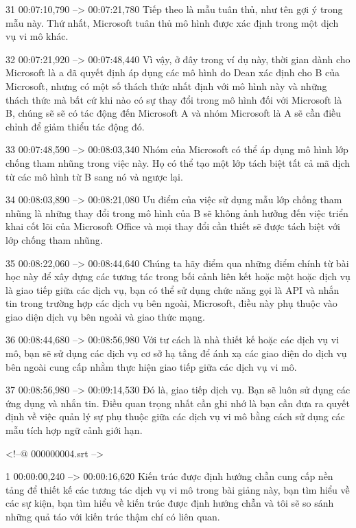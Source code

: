 31
00:07:10,790 --> 00:07:21,780
Tiếp theo là mẫu tuân thủ, như tên gợi ý trong mẫu này.  Thứ nhất, Microsoft tuân thủ mô hình được xác định trong một dịch vụ vi mô khác.

32
00:07:21,920 --> 00:07:48,440
Vì vậy, ở đây trong ví dụ này, thời gian dành cho Microsoft là a đã quyết định áp dụng các mô hình do Dean xác định cho B của Microsoft, nhưng có một số thách thức nhất định với mô hình này và những thách thức mà bất cứ khi nào có sự thay đổi trong mô hình đối với Microsoft là B, chúng sẽ  sẽ có tác động đến Microsoft A và nhóm Microsoft là A sẽ cần điều chỉnh để giảm thiểu tác động đó.

33
00:07:48,590 --> 00:08:03,340
Nhóm của Microsoft có thể áp dụng mô hình lớp chống tham nhũng trong việc này.  Họ có thể tạo một lớp tách biệt tất cả mã dịch từ các mô hình từ B sang nó và ngược lại.

34
00:08:03,890 --> 00:08:21,080
Ưu điểm của việc sử dụng mẫu lớp chống tham nhũng là những thay đổi trong mô hình của B sẽ không ảnh hưởng đến việc triển khai cốt lõi của Microsoft Office và mọi thay đổi cần thiết sẽ được tách biệt với lớp chống tham nhũng.

35
00:08:22,060 --> 00:08:44,640
Chúng ta hãy điểm qua những điểm chính từ bài học này để xây dựng các tương tác trong bối cảnh liên kết hoặc một hoặc dịch vụ là giao tiếp giữa các dịch vụ, bạn có thể sử dụng chức năng gọi là API và nhắn tin trong trường hợp các dịch vụ bên ngoài, Microsoft, điều này phụ thuộc vào giao diện dịch vụ bên ngoài và  giao thức mạng.

36
00:08:44,680 --> 00:08:56,980
Với tư cách là nhà thiết kế hoặc các dịch vụ vi mô, bạn sẽ sử dụng các dịch vụ cơ sở hạ tầng để ánh xạ các giao diện do dịch vụ bên ngoài cung cấp nhằm thực hiện giao tiếp giữa các dịch vụ vi mô.

37
00:08:56,980 --> 00:09:14,530
Đó là, giao tiếp dịch vụ.  Bạn sẽ luôn sử dụng các ứng dụng và nhắn tin.  Điều quan trọng nhất cần ghi nhớ là bạn cần đưa ra quyết định về việc quản lý sự phụ thuộc giữa các dịch vụ vi mô bằng cách sử dụng các mẫu tích hợp ngữ cảnh giới hạn.

<!--@ 000000004.srt -->

1
00:00:00,240 --> 00:00:16,620
Kiến trúc được định hướng chẵn cung cấp nền tảng để thiết kế các tương tác dịch vụ vi mô trong bài giảng này, bạn tìm hiểu về các sự kiện, bạn tìm hiểu về kiến ​​trúc được định hướng chẵn và tôi sẽ so sánh những quả táo với kiến ​​trúc thậm chí có liên quan.

